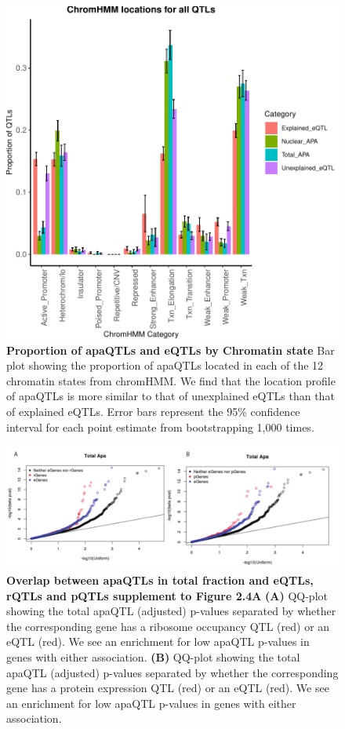 \begin{figure}[!htb]
\centering
\includegraphics[width=5in]{img/ch02/Fig3_figuresupplement3.pdf}
\caption[Proportion of apaQTLs and eQTLs by Chromatin state]{\textbf{Proportion of apaQTLs and eQTLs by Chromatin state} Bar plot showing the proportion of apaQTLs located in each of the 12 chromatin states from chromHMM. We find that the location profile of apaQTLs is more similar to that of unexplained eQTLs than that of explained eQTLs. Error bars represent the 95\% confidence interval for each point estimate from bootstrapping 1,000 times.}
\label{fig:chromHMM}
\end{figure}
\clearpage

\begin{figure}[!htb]
\centering
\includegraphics[width=5in]{img/ch02/Fig4_figuresupplement1.pdf}
\caption[Overlap between apaQTLs in total fraction and eQTLs, rQTLs and pQTLs supplement to Figure 2.4A]{\textbf{Overlap between apaQTLs in total fraction and eQTLs, rQTLs and pQTLs supplement to Figure 2.4A} {\bf (A)} QQ-plot showing the total apaQTL (adjusted) p-values separated by whether the corresponding gene has a ribosome occupancy QTL (red) or an eQTL (red). We see an enrichment for low apaQTL p-values in genes with either association. {\bf (B)} QQ-plot showing the total apaQTL (adjusted) p-values separated by whether the corresponding gene has a protein expression QTL (red) or an eQTL (red). We see an enrichment for low apaQTL p-values in genes with either association.}
\label{fig:totpgene}
\end{figure}
\clearpage

